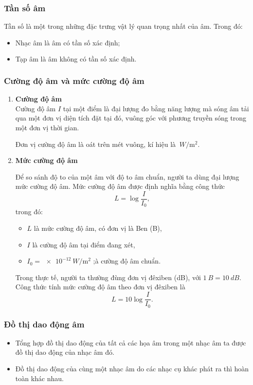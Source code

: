 \subsubsection{Tần số âm}	
Tần số là một trong những đặc trưng vật lý quan trọng nhất của âm. Trong đó:
\begin{itemize}
	\item Nhạc âm là âm có tần số xác định;
	\item Tạp âm là âm không có tần số xác định.
\end{itemize}
\subsubsection{Cường độ âm và mức cường độ âm}
\begin{enumerate}[label=\alph*)]
	\item \textbf{Cường độ âm}	\\
	Cường độ âm $I$ tại một điểm là đại lượng đo bằng năng lượng mà sóng âm tải qua một đơn vị diện tích đặt tại đó, vuông góc với phương truyền sóng trong một đơn vị thời gian.
	
	Đơn vị cường độ âm là oát trên mét vuông, kí hiệu là $\SI{}{W/\meter^2}$.
	\item \textbf{Mức cường độ âm}	
	
	Để so sánh độ to của một âm với độ to âm chuẩn, người ta dùng đại lượng mức cường độ âm. Mức cường độ âm được định nghĩa bằng công thức
	\begin{equation*}
		L=\log\dfrac{I}{I_0},
	\end{equation*}
	trong đó:
	\begin{itemize}
		\item $L$ là mức cường độ âm, có đơn vị là Ben (B),
		\item $I$ là cường độ âm tại điểm đang xét,
		\item $I_0=\SI{e-12}{W/\meter^2}$ ;à cường độ âm chuẩn.
	\end{itemize}
	Trong thực tế, người ta thường đùng đơn vị đêxiben (dB), với $\SI{1}{B}=\SI{10}{dB}$. Công thức tính mức cường độ âm theo đơn vị đêxiben là
	\begin{equation*}
		L=10\log\dfrac{I}{I_0}.
	\end{equation*}	
\end{enumerate}
\subsubsection {Đồ thị dao động âm}
\begin{itemize}
	\item Tổng hợp đồ thị dao động của tất cả các họa âm trong một nhạc âm ta được đồ thị dao động của nhạc âm đó.
	\item Đồ thị dao động của cùng một nhạc âm do các nhạc cụ khác phát ra thì hoàn toàn khác nhau.
\end{itemize}	
